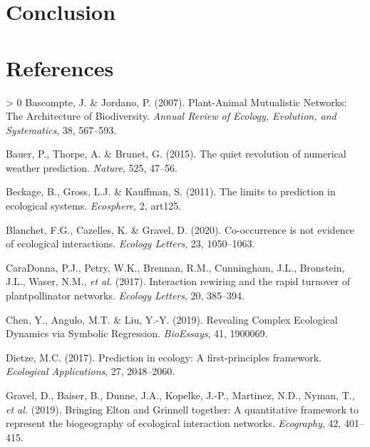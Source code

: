 \documentclass[10pt,oneside]{article}
\newlength{\cslhangindent}
\newenvironment{CSLReferences}[3] %
 {%
  \setlength{\parindent}{0pt}
  \ifodd #1 \everypar{\setlength{\hangindent}{\cslhangindent}}\ignorespaces\fi
  \ifnum #2 > 0
  \setlength{\parskip}{#2\baselineskip}
  \fi
 }%
 {}
\begin{document}
\hypertarget{conclusion}{%
\section{Conclusion}\label{conclusion}}

\hypertarget{references}{%
\section*{References}\label{references}}

\hypertarget{refs}{}
\begin{CSLReferences}{1}{0}
\leavevmode\hypertarget{ref-Bascompte2007PlaMut}{}%
Bascompte, J. \& Jordano, P. (2007). Plant-Animal Mutualistic Networks:
The Architecture of Biodiversity. \emph{Annual Review of Ecology,
Evolution, and Systematics}, 38, 567--593.

\leavevmode\hypertarget{ref-Bauer2015QuiRev}{}%
Bauer, P., Thorpe, A. \& Brunet, G. (2015). The quiet revolution of
numerical weather prediction. \emph{Nature}, 525, 47--56.

\leavevmode\hypertarget{ref-Beckage2011LimPre}{}%
Beckage, B., Gross, L.J. \& Kauffman, S. (2011). The limits to
prediction in ecological systems. \emph{Ecosphere}, 2, art125.

\leavevmode\hypertarget{ref-Blanchet2020CooNot}{}%
Blanchet, F.G., Cazelles, K. \& Gravel, D. (2020). Co-occurrence is not
evidence of ecological interactions. \emph{Ecology Letters}, 23,
1050--1063.

\leavevmode\hypertarget{ref-CaraDonna2017IntRew}{}%
CaraDonna, P.J., Petry, W.K., Brennan, R.M., Cunningham, J.L.,
Bronstein, J.L., Waser, N.M., \emph{et al.} (2017). Interaction rewiring
and the rapid turnover of plantpollinator networks. \emph{Ecology
Letters}, 20, 385--394.

\leavevmode\hypertarget{ref-Chen2019RevCom}{}%
Chen, Y., Angulo, M.T. \& Liu, Y.-Y. (2019). Revealing Complex
Ecological Dynamics via Symbolic Regression. \emph{BioEssays}, 41,
1900069.

\leavevmode\hypertarget{ref-Dietze2017PreEco}{}%
Dietze, M.C. (2017). Prediction in ecology: A first-principles
framework. \emph{Ecological Applications}, 27, 2048--2060.

\leavevmode\hypertarget{ref-Gravel2019BriElt}{}%
Gravel, D., Baiser, B., Dunne, J.A., Kopelke, J.-P., Martinez, N.D.,
Nyman, T., \emph{et al.} (2019). Bringing Elton and Grinnell together: A
quantitative framework to represent the biogeography of ecological
interaction networks. \emph{Ecography}, 42, 401--415.


\end{CSLReferences}
\end{document}
